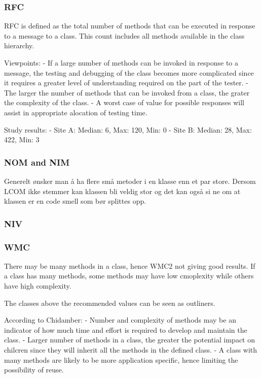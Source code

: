 \subsubsection{RFC}
RFC is defined as the total number of methods that can be executed in response to a message to a class. This count includes all methods available in the class hierarchy. 

Viewpoints:
- If a large number of methods can be invoked in response to a message, the testing and debugging of the class becomes more complicated since it requires a greater level of understanding required on the part of the tester. 
- The larger the number of methods that can be invoked from a class, the grater the complexity of the class.
- A worst case of value for possible responses will assist in appropriate alocation of testing time.

Study results:
- Site A: Median: 6, Max: 120, Min: 0
- Site B: Median: 28, Max: 422, Min: 3

\subsubsection{NOM and NIM}
Generelt ønsker man å ha flere små metoder i en klasse enn et par store. Dersom LCOM ikke stemmer kan klassen bli veldig stor og det kan også si ne om at klassen er en code smell som bør splittes opp.

\subsubsection{NIV}

\subsubsection{WMC}
There may be many methods in a class, hence WMC2 not giving good results. If a class has many methods, some methods may have low cmoplexity while others have high complexity.



The classes above the recommended values can be seen as outliners. 

According to Chidamber: 
- Number and complexity of methods may be an indicator of how much time and effort is required to develop and maintain the class.
- Larger number of methods in a class, the greater the potential impact on chilcren since they will inherit all the methods in the defined class.
- A class with many methods are likely to be more application specific, hence limiting the possibility of reuse.

